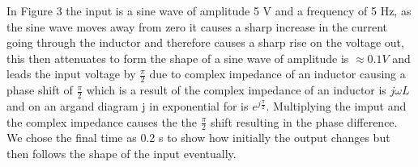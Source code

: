 \documentclass[10pt,a4paper]{article}
\begin{document}
\vspace{8mm}In Figure 3 the input is a sine wave of amplitude 5 V and a frequency of 5 Hz, as the sine wave moves away from zero it causes a sharp increase in the current going through the inductor and therefore causes a sharp rise on the voltage out, this then attenuates to form the shape of a sine wave of amplitude is $\approx 0.1 V$ and leads the input voltage by $\frac{\pi}{2}$ due to complex impedance of an inductor causing a phase shift of $\frac{\pi}{2}$ which is a result of the complex impedance of an inductor is $j\omega L$ and on an argand diagram j in exponential for is $e^{j\frac{\pi}{2}}$. Multiplying the imput and the complex impedance causes the the $\frac{\pi}{2}$ shift resulting in the phase difference. We chose the final time as 0.2 s to show how initially the output changes but then follows the shape of the input eventually.
\end{document}
